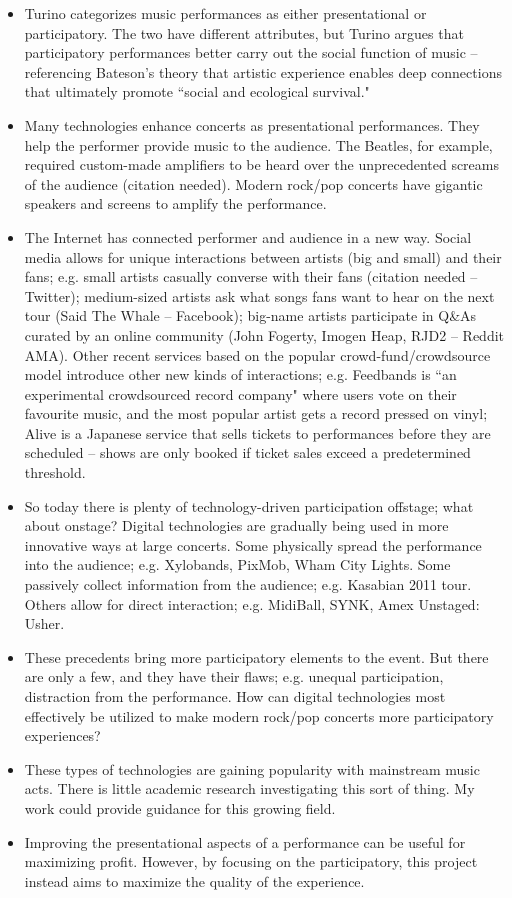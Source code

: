 \begin{itemize}
	\item Turino categorizes music performances as either presentational or participatory. The two have different attributes, but Turino argues that participatory performances better carry out the social function of music -- referencing Bateson's theory that artistic experience enables deep connections that ultimately promote ``social and ecological survival."
	\item Many technologies enhance concerts as presentational performances. They help the performer provide music to the audience. The Beatles, for example, required custom-made amplifiers to be heard over the unprecedented screams of the audience (citation needed). Modern rock/pop concerts have gigantic speakers and screens to amplify the performance.
	\item The Internet has connected performer and audience in a new way. Social media allows for unique interactions between artists (big and small) and their fans; e.g. small artists casually converse with their fans (citation needed -- Twitter); medium-sized artists ask what songs fans want to hear on the next tour (Said The Whale -- Facebook); big-name artists participate in Q\&As curated by an online community (John Fogerty, Imogen Heap, RJD2 -- Reddit AMA). Other recent services based on the popular crowd-fund/crowdsource model introduce other new kinds of interactions; e.g. Feedbands is ``an experimental crowdsourced record company" where users vote on their favourite music, and the most popular artist gets a record pressed on vinyl; Alive is a Japanese service that sells tickets to performances before they are scheduled -- shows are only booked if ticket sales exceed a predetermined threshold.
	\item So today there is plenty of technology-driven participation offstage; what about onstage? Digital technologies are gradually being used in more innovative ways at large concerts. Some physically spread the performance into the audience; e.g. Xylobands, PixMob, Wham City Lights. Some passively collect information from the audience; e.g. Kasabian 2011 tour. Others allow for direct interaction; e.g. MidiBall, SYNK, Amex Unstaged: Usher.
	\item These precedents bring more participatory elements to the event. But there are only a few, and they have their flaws; e.g. unequal participation, distraction from the performance. How can digital technologies most effectively be utilized to make modern rock/pop concerts more participatory experiences?
	\item These types of technologies are gaining popularity with mainstream music acts. There is little academic research investigating this sort of thing. My work could provide guidance for this growing field.
	\item Improving the presentational aspects of a performance can be useful for maximizing profit. However, by focusing on the participatory, this project instead aims to maximize the quality of the experience.
\end{itemize}

